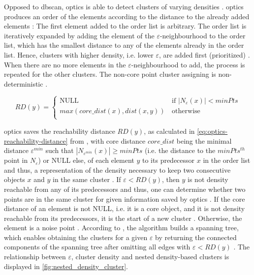 Opposed to \ac{dbscan}, \ac{optics} is able to detect clusters of varying densities \cite{OPTICS2014}.
\ac{optics} produces an order of the elements according to the distance to the already added elements \cite{OPTICS2014, OPTICS2013}:
The first element added to the order list is arbitrary.
The order list is iteratively expanded by adding the element of the $\varepsilon$-neighbourhood to the order list, which has the smallest distance to any of the elements already in the order list.
Hence, clusters with higher density, i.e. lower $\varepsilon$, are added first (prioritized) \cite{OPTICS_kMeans_2016, OPTICS1999}.
When there are no more elements in the $\varepsilon$-neighbourhood to add, the process is repeated for the other clusters.
The non-core point cluster assigning is non-deterministic \cite{OPTICS2013}.

\begin{equation}
    RD(y) = \left\{
    \begin{array}{ll}
    \textrm{NULL} & \, \textrm{if |}N_\varepsilon (x)| < minPts \\
    max(core\_dist(x), dist(x,y)) & \, \textrm{otherwise} \\
    \end{array}
    \right. 
    \label{eq:optics-reachability-distance}
\end{equation}

\ac{optics} saves the reachability distance $RD(y)$, as calculated in \autoref{eq:optics-reachability-distance} from \cite{OPTICS2013},
with core distance $core\_dist$ being the minimal distance $\varepsilon^{min}$ such that $| N_{\varepsilon^{min}} (x) | \geq minPts$ 
(i.e. the distance to the $minPts^{th}$ point in $N_\varepsilon$) or NULL else, 
of each element $y$ to its predecessor $x$ in the order list and thus, 
a representation of the density necessary to keep two consecutive objects $x$ and $y$ in the same cluster \cite{OPTICS2013}.
If $\varepsilon < RD(y)$, then $y$ is not density reachable from any of its predecessors and thus, 
one can determine whether two points are in the same cluster for given information saved by \ac{optics} \cite{OPTICS2013, OPTICS1999}.
If the core distance of an element is not NULL, i.e. it is a core object, and it is not density reachable from its predecessors, it is the start of a new cluster \cite{OPTICS1999}.
Otherwise, the element is a noise point \cite{OPTICS1999}.
According to \citeauthor{OPTICS2013}, the algorithm builds a spanning tree, which enables obtaining the clusters for a given $\varepsilon$ by returning the connected components 
of the spanning tree after omitting all edges with $\varepsilon < RD(y)$ \cite{OPTICS2013}.
The relationship between $\varepsilon$, cluster density and nested density-based clusters is displayed in \autoref{fig:nested_density_cluster}.

